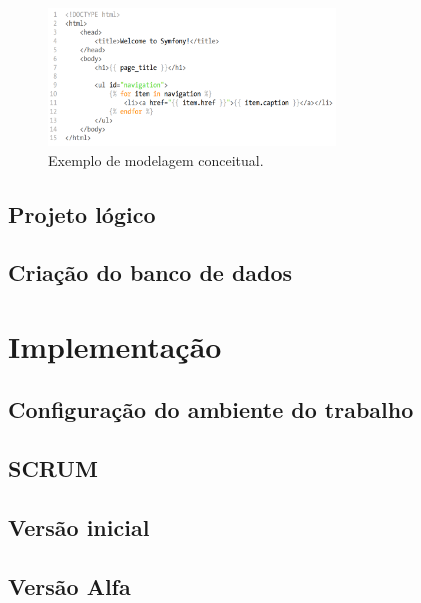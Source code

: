 \documentclass[cic,tc]{iiufrgs}
\begin{document}
\begin{figure}[h]
    \caption{Exemplo de modelagem conceitual.}
       	\begin{center}
            \includegraphics[width=0.68\textwidth]{figuras/twig-symf.png}
        \end{center}
    \label{modelagemBDExemplol}
\end{figure}

\subsection{Projeto lógico}
\label{BDProjeto}

\subsection{Criação do banco de dados}
\label{BDCriacao}

\section{Implementação}
\label{metodologiaImplementação}

\subsection{Configuração do ambiente do trabalho}
\label{implementacaoConfig}

\subsection{SCRUM}
\label{implementacaoSCRUM}

\subsection{Versão inicial}
\label{implementacaoIR}

\subsection{Versão Alfa}
\label{implementacaoAR}
\end{document}
